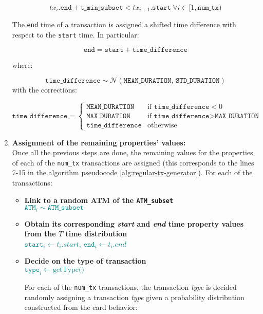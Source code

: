 \begin{enumerate}
    $$tx_i.\texttt{end} + \texttt{t\_min\_subset} < tx_{i+1}.\texttt{start} \ \forall i \in [1,\texttt{num\_tx})$$

    The \texttt{end} time of a transaction is assigned a shifted time difference with respect to the \texttt{start} time. In particular:

    $$
    \texttt{end} = \texttt{start} + \texttt{time\_difference}
    $$

    where:

    $$\texttt{time\_difference} \sim \mathcal{N}(\texttt{MEAN\_DURATION},\,\texttt{STD\_DURATION})$$ with the corrections:

    $$
    \texttt{time\_difference} =
    \begin{cases} 
        \texttt{MEAN\_DURATION} & \text{if } \texttt{time\_difference} < 0 \\
        \texttt{MAX\_DURATION} & \text{if } \texttt{time\_difference} > \texttt{MAX\_DURATION} \\
        \texttt{time\_difference} & \text{otherwise}
    \end{cases}
    $$
    \item \textbf{Assignment of the remaining properties' values:\\}
    Once all the previous steps are done, the remaining values for the properties of each of the \texttt{num\_tx} transactions are assigned (this corresponds to the lines 7-15 in the algorithm pseudocode \ref{alg:regular-tx-generator}). For each of the transactions:
    \begin{itemize}
        \item \textbf{Link to a random ATM of the \texttt{ATM\_subset}}\\
        {\footnotesize \textcolor{teal}{$\texttt{ATM}_{i} \sim \texttt{ATM\_subset}$}}
        \item \textbf{Obtain its corresponding \emph{start} and \emph{end} time property values from the $T$ time distribution}\\
        {\footnotesize \textcolor{teal}{$\texttt{start}_{i} \gets t_i.start$, }}
        {\footnotesize \textcolor{teal}{$\texttt{end}_{i} \gets t_i.end$}}
        \item \textbf{Decide on the type of transaction}\\
        {\footnotesize \textcolor{teal}{$\texttt{type}_{i} \gets \text{getType()}$}}
        
        For each of the \texttt{num\_tx} transactions, the transaction \emph{type} is decided randomly assigning a transaction \emph{type} given a probability distribution constructed from the card behavior:
        

\end{itemize}
\end{enumerate}
